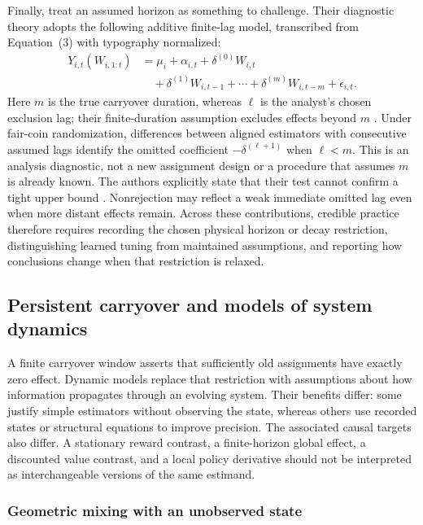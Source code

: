\documentclass[12pt]{article}
\begin{document}
Finally, \citet{carryover2025} treat an assumed horizon as something to challenge. Their diagnostic theory adopts the following additive finite-lag model, transcribed from Equation~(3) with typography normalized:
\begin{equation}\label{eq:carryover-diagnostic-model}
\begin{aligned}
Y_{i,t}(W_{i,1:t})
 &=\mu_i+\alpha_{i,t}+\delta^{(0)}W_{i,t}\\
 &\quad+\delta^{(1)}W_{i,t-1}+\cdots+\delta^{(m)}W_{i,t-m}+\epsilon_{i,t}.
\end{aligned}
\end{equation}
Here $m$ is the true carryover duration, whereas $\ell$ is the analyst's chosen exclusion lag; their finite-duration assumption excludes effects beyond $m$ \citep[Assumption~2, p.~2; Eq.~(3), p.~3]{carryover2025}. Under fair-coin randomization, differences between aligned estimators with consecutive assumed lags identify the omitted coefficient $-\delta^{(\ell+1)}$ when $\ell<m$. This is an analysis diagnostic, not a new assignment design or a procedure that assumes $m$ is already known. The authors explicitly state that their test cannot confirm a tight upper bound \citep[Section~3.1, p.~3]{carryover2025}. Nonrejection may reflect a weak immediate omitted lag even when more distant effects remain. Across these contributions, credible practice therefore requires recording the chosen physical horizon or decay restriction, distinguishing learned tuning from maintained assumptions, and reporting how conclusions change when that restriction is relaxed.

\subsection{Persistent carryover and models of system dynamics}
\label{sec:dynamic}

A finite carryover window asserts that sufficiently old assignments have exactly zero effect. Dynamic models replace that restriction with assumptions about how information propagates through an evolving system. Their benefits differ: some justify simple estimators without observing the state, whereas others use recorded states or structural equations to improve precision. The associated causal targets also differ. A stationary reward contrast, a finite-horizon global effect, a discounted value contrast, and a local policy derivative should not be interpreted as interchangeable versions of the same estimand.

\subsubsection{Geometric mixing with an unobserved state}
\end{document}
